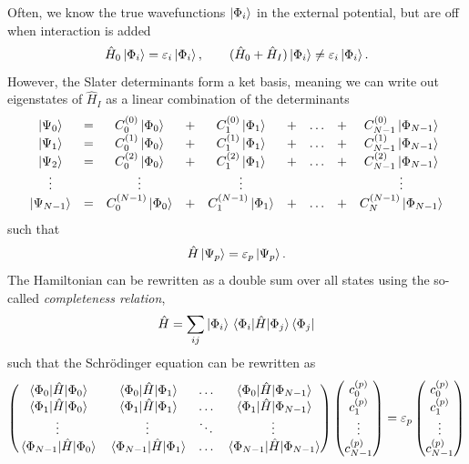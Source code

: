 Often, we know the true wavefunctions $\ket{\Phi_i}$ in the external potential, but are off when interaction is added
\begin{equation}
\hat{H}_0\ket{\Phi_i}=\varepsilon_i\ket{\Phi_i},\qquad (\hat{H}_0+\hat{H}_I)\ket{\Phi_i}\neq\varepsilon_i\ket{\Phi_i}.
\end{equation}
However, the Slater determinants form a ket basis, meaning we can write out eigenstates of $\hat{H}_I$ as a linear combination of the determinants
\begin{equation}
	\mqty{
	\ket{\Psi_0}&=&C_0^{(0)}\ket{\Phi_0}&+&C_1^{(0)}\ket{\Phi_1}&+&\hdots&+&C_{N-1}^{(0)}\ket{\Phi_{N-1}}\\
	\ket{\Psi_1}&=&C_0^{(1)}\ket{\Phi_0}&+&C_1^{(1)}\ket{\Phi_1}&+&\hdots&+&C_{N-1}^{(1)}\ket{\Phi_{N-1}}\\
	\ket{\Psi_2}&=&C_0^{(2)}\ket{\Phi_0}&+&C_1^{(2)}\ket{\Phi_1}&+&\hdots&+&C_{N-1}^{(2)}\ket{\Phi_{N-1}}\\
	\vdots&&\vdots&&\vdots&&&&\vdots\\
	\ket{\Psi_{N-1}}&=&C_0^{(N-1)}\ket{\Phi_0}&+&C_1^{(N-1)}\ket{\Phi_1}&+&\hdots&+&C_N^{(N-1)}\ket{\Phi_{N-1}}
	}
\end{equation}
such that 
\begin{equation}
\hat{H}\ket{\Psi_p}=\varepsilon_p\ket{\Psi_p}.
\end{equation}
The Hamiltonian can be rewritten as a double sum over all states using the so-called \textit{completeness relation}, 
\begin{equation}
\hat{H}=\sum_{ij}\ket{\Phi_i}\mel{\Phi_i}{\hat{H}}{\Phi_j}\bra{\Phi_j}
\end{equation}
such that the Schr\"odinger equation can be rewritten as
\begin{equation}
\begin{pmatrix}
\mel{\Phi_0}{\hat{H}}{\Phi_0} & \mel{\Phi_0}{\hat{H}}{\Phi_1} & \hdots & \mel{\Phi_0}{\hat{H}}{\Phi_{N-1}}\\
\mel{\Phi_1}{\hat{H}}{\Phi_0} & \mel{\Phi_1}{\hat{H}}{\Phi_1} & \hdots & \mel{\Phi_1}{\hat{H}}{\Phi_{N-1}}\\
\vdots & \vdots & \ddots & \vdots\\
\mel{\Phi_{N-1}}{\hat{H}}{\Phi_0} & \mel{\Phi_{N-1}}{\hat{H}}{\Phi_1} & \hdots & \mel{\Phi_{N-1}}{\hat{H}}{\Phi_{N-1}}\\
\end{pmatrix}
\begin{pmatrix}
c_0^{(p)}\\ c_1^{(p)} \\ \vdots\\ c_{N-1}^{(p)}
\end{pmatrix}
=\varepsilon_p
\begin{pmatrix}
c_0^{(p)}\\ c_1^{(p)} \\ \vdots\\ c_{N-1}^{(p)}
\end{pmatrix}
\label{eq:CIS_matrix}
\end{equation}

